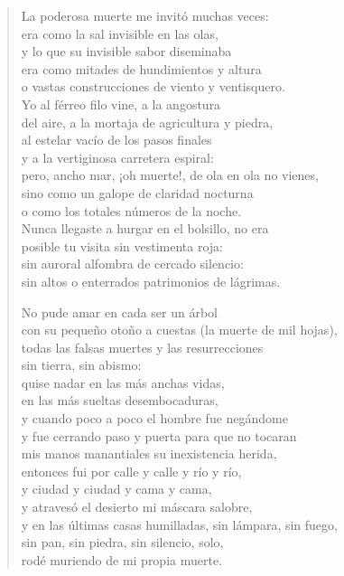 \documentclass[12pt]{article}
\begin{document}
\begin{verse}
La poderosa muerte me invitó muchas veces:\\
era como la sal invisible en las olas,\\
y lo que su invisible sabor diseminaba\\
era como mitades de hundimientos y altura\\
o vastas construcciones de viento y ventisquero.\\
Yo al férreo filo vine, a la angostura\\
del aire, a la mortaja de agricultura y piedra,\\
al estelar vacío de los pasos finales\\
y a la vertiginosa carretera espiral:\\
pero, ancho mar, ¡oh muerte!, de ola en ola no vienes,\\
sino como un galope de claridad nocturna\\
o como los totales números de la noche.\\
Nunca llegaste a hurgar en el bolsillo, no era\\
posible tu visita sin vestimenta roja:\\
sin auroral alfombra de cercado silencio:\\
sin altos o enterrados patrimonios de lágrimas.  

No pude amar en cada ser un árbol\\
con su pequeño otoño a cuestas (la muerte de mil hojas),\\
todas las falsas muertes y las resurrecciones\\
sin tierra, sin abismo:\\
quise nadar en las más anchas vidas,\\
en las más sueltas desembocaduras,\\
y cuando poco a poco el hombre fue negándome\\
y fue cerrando paso y puerta para que no tocaran\\
mis manos manantiales su inexistencia herida,\\
entonces fui por calle y calle y río y río,\\
y ciudad y ciudad y cama y cama,\\
y atravesó el desierto mi máscara salobre,\\
y en las últimas casas humilladas, sin lámpara, sin fuego,\\
sin pan, sin piedra, sin silencio, solo,\\
rodé muriendo de mi propia muerte.  


\end{verse}
\end{document}
